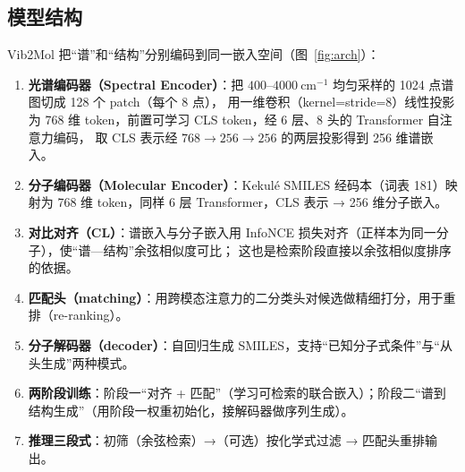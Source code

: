 \documentclass[UTF8,a4paper,11pt]{ctexart}
\begin{document}
\subsection{模型结构}
Vib2Mol 把“谱”和“结构”分别编码到同一嵌入空间（图~\ref{fig:arch}）：
\begin{enumerate}[leftmargin=1.4em,itemsep=1pt]
\item \textbf{光谱编码器（Spectral Encoder）}：把 $400$--$4000\ \mathrm{cm}^{-1}$ 均匀采样的 1024 点谱图切成 128 个 patch（每个 8 点），
用一维卷积（kernel=stride=8）线性投影为 768 维 token，前置可学习 CLS token，经 6 层、8 头的 Transformer 自注意力编码，
取 CLS 表示经 $768\to256\to256$ 的两层投影得到 256 维谱嵌入。
\item \textbf{分子编码器（Molecular Encoder）}：Kekulé SMILES 经码本（词表 181）映射为 768 维 token，同样 6 层 Transformer，CLS 表示 → 256 维分子嵌入。
\item \textbf{对比对齐（CL）}：谱嵌入与分子嵌入用 InfoNCE 损失对齐（正样本为同一分子），使“谱—结构”余弦相似度可比；
这也是检索阶段直接以余弦相似度排序的依据。
\item \textbf{匹配头（matching）}：用跨模态注意力的二分类头对候选做精细打分，用于重排（re-ranking）。
\item \textbf{分子解码器（decoder）}：自回归生成 SMILES，支持“已知分子式条件”与“从头生成”两种模式。
\item \textbf{两阶段训练}：阶段一“对齐 + 匹配”（学习可检索的联合嵌入）；阶段二“谱到结构生成”（用阶段一权重初始化，接解码器做序列生成）。
\item \textbf{推理三段式}：初筛（余弦检索）→（可选）按化学式过滤 → 匹配头重排输出。
\end{enumerate}
\end{document}
